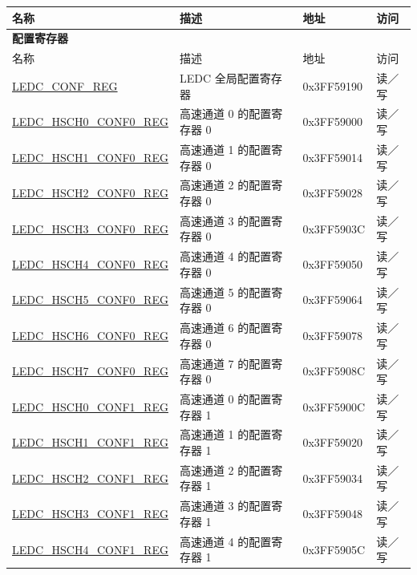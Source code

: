 \begin{longtable}{ | p{5cm} | p{7cm} | p{2.2cm} | p{1.2cm} | }
\hline\rowcolor{lightgray}
名称 & 描述 & 地址 & 访问 \\ \hline
\multicolumn{4}{|l|}{\textbf{配置寄存器}} \\ \hline
\endfirsthead
        \hline
        \rowcolor{lightgray}
       名称 & 描述 & 地址 & 访问  \\
        \hline
        \endhead
        \endfoot
\hyperref[regdesc:LEDCCONFREG]{LEDC\_CONF\_REG} & LEDC 全局配置寄存器 & 0x3FF59190 & 读／写\\ \hline
\hyperref[regdesc:LEDCHSCHnCONF0REG]{LEDC\_HSCH0\_CONF0\_REG} & 高速通道 0 的配置寄存器 0 & 0x3FF59000 & 读／写 \\ \hline
\hyperref[regdesc:LEDCHSCHnCONF0REG]{LEDC\_HSCH1\_CONF0\_REG} & 高速通道 1 的配置寄存器 0 & 0x3FF59014 & 读／写 \\ \hline
\hyperref[regdesc:LEDCHSCHnCONF0REG]{LEDC\_HSCH2\_CONF0\_REG} & 高速通道 2 的配置寄存器 0 & 0x3FF59028 & 读／写 \\ \hline
\hyperref[regdesc:LEDCHSCHnCONF0REG]{LEDC\_HSCH3\_CONF0\_REG} & 高速通道 3 的配置寄存器 0 & 0x3FF5903C & 读／写 \\ \hline
\hyperref[regdesc:LEDCHSCHnCONF0REG]{LEDC\_HSCH4\_CONF0\_REG} & 高速通道 4 的配置寄存器 0 & 0x3FF59050 &读／写 \\ \hline
\hyperref[regdesc:LEDCHSCHnCONF0REG]{LEDC\_HSCH5\_CONF0\_REG} & 高速通道 5 的配置寄存器 0 & 0x3FF59064 &读／写 \\ \hline
\hyperref[regdesc:LEDCHSCHnCONF0REG]{LEDC\_HSCH6\_CONF0\_REG} & 高速通道 6 的配置寄存器 0 & 0x3FF59078 & 读／写 \\ \hline
\hyperref[regdesc:LEDCHSCHnCONF0REG]{LEDC\_HSCH7\_CONF0\_REG} & 高速通道 7 的配置寄存器 0 & 0x3FF5908C &读／写 \\ \hline
\hyperref[regdesc:LEDCHSCHnCONF1REG]{LEDC\_HSCH0\_CONF1\_REG} & 高速通道 0 的配置寄存器 1 & 0x3FF5900C & 读／写 \\ \hline
\hyperref[regdesc:LEDCHSCHnCONF1REG]{LEDC\_HSCH1\_CONF1\_REG} & 高速通道 1 的配置寄存器 1 & 0x3FF59020 & 读／写 \\ \hline
\hyperref[regdesc:LEDCHSCHnCONF1REG]{LEDC\_HSCH2\_CONF1\_REG} & 高速通道 2 的配置寄存器 1 & 0x3FF59034 & 读／写 \\ \hline
\hyperref[regdesc:LEDCHSCHnCONF1REG]{LEDC\_HSCH3\_CONF1\_REG} & 高速通道 3 的配置寄存器 1 & 0x3FF59048 &读／写 \\ \hline
\hyperref[regdesc:LEDCHSCHnCONF1REG]{LEDC\_HSCH4\_CONF1\_REG} & 高速通道 4 的配置寄存器 1 & 0x3FF5905C & 读／写 \\ \hline

\end{longtable}
